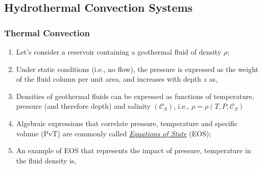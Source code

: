 \documentclass[10pt,compress,unknownkeysallowed]{beamer}
\begin{document}
\subsection{Hydrothermal Convection Systems}

\begin{frame}
 \frametitle{Thermal Convection}
    \begin{enumerate}[1.] \scriptsize
       \item <1-> Let's consider a reservoir containing a geothermal fluid of density $\rho$; 
       \item <2-> Under static conditions (i.e., no flow), the pressure is expressed as the weight of the fluid column per unit area, and increases with depth $z$ as,
       \item <3-> Densities of geothermal fluids can be expressed as functions of temperature, pressure (and therefore depth) and salinity $\left(\mathcal{C}_{S}\right)$, i.e., $\rho=\rho\left(T,P,\mathcal{C}_{S}\right)$
       \item <4-> Algebraic expressions that correlate pressure, temperature and specific volume (PvT) are commonly called \underline{\it Equations of State} (EOS);
       \item <5-> An example of EOS that represents the impact of pressure, temperature in the fluid density is, 
    \end{enumerate}
\end{frame}
\end{document}
